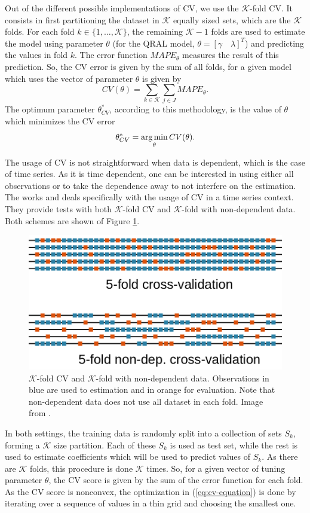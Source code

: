 Out of the different possible implementations of CV, we use the $\mathcal{K}$-fold CV. It consists in first partitioning the dataset in $\mathcal{K}$ equally sized sets, which are the $\mathcal{K}$ folds. For each fold $k \in \{1,\dots,\mathcal{K}\}$, the remaining $\mathcal{K}-1$ folds are used to estimate the model using parameter $\theta$ (for the QRAL model, $\theta = [\gamma \quad \lambda]^T$) and predicting the values in fold $k$. The error function $MAPE_\theta$ measures the result of this prediction.
So, the CV error is given by the sum of all folds, for a given model which uses the vector of parameter $\theta$ is given by
\[
 CV(\theta) = \sum_{k \in \mathcal{K}} \sum_{j \in J} MAPE_\theta.\label{eq:cv-error}
\]
The optimum parameter $\theta^*_{CV}$, according to this methodology, is the value of $\theta$ which minimizes the CV error
\begin{equation}
\theta_{CV}^* = \argmin_\theta CV(\theta) .\label{eq:cv-equation}
\end{equation}

The usage of CV is not straightforward when data is dependent, which is the case of time series. As it is time dependent, one can be interested in using either all observations or to take the dependence away to not interfere on the estimation. The works
\cite{bergmeir_note_2017} and \cite{bergmeir_use_2012} deals specifically with the usage of CV in a time series context. They provide tests with both $\mathcal{K}$-fold CV and $\mathcal{K}$-fold with non-dependent data. Both schemes are shown of Figure \ref{fig:cross-validation-scheme}.
\begin{figure}
	\centering
	\includegraphics[width=0.7\linewidth]{Images/Cross-validation-scheme}
	\caption{$\mathcal{K}$-fold CV and $\mathcal{K}$-fold with non-dependent data. Observations in blue are used to estimation and in orange for evaluation. Note that non-dependent data does not use all dataset in each fold. Image from \cite{bergmeir_note_2017}.}
	\label{fig:cross-validation-scheme}
\end{figure}
In both settings, the training data is randomly split into a collection of sets $S_k$, forming a $\mathcal{K}$ size partition. Each of these $S_k$ is used as test set, while the rest is used to estimate coefficients which will be used to predict values of $S_k$. 
As there are $\mathcal{K}$ folds, this procedure is done $\mathcal{K}$ times. 
So, for a given vector of tuning parameter $\theta$, the CV score is given by the sum of the error function for each fold. 
As the CV score is nonconvex, the optimization in (\ref{eq:cv-equation}) is done by iterating over a sequence of values in a thin grid and choosing the smallest one.




